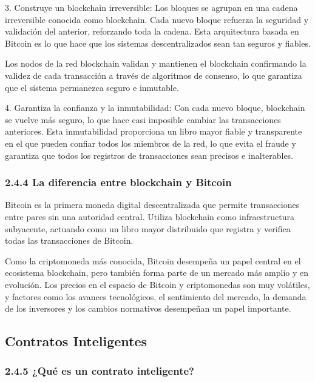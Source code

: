 \documentclass[12pt,a4paper]{article}
\begin{document}
3. Construye un blockchain irreversible: Los bloques se agrupan en una cadena irreversible conocida como blockchain. Cada nuevo bloque refuerza la seguridad y validación del anterior, reforzando toda la cadena. Esta arquitectura basada en Bitcoin es lo que hace que los sistemas descentralizados sean tan seguros y fiables.

Los nodos de la red blockchain validan y mantienen el blockchain confirmando la validez de cada
transacción a través de algoritmos de consenso, lo que garantiza que el sistema permanezca seguro
e inmutable.

4. Garantiza la confianza y la inmutabilidad: Con cada nuevo bloque, blockchain se vuelve más
seguro, lo que hace casi imposible cambiar las transacciones anteriores. Esta inmutabilidad
proporciona un libro mayor fiable y transparente en el que pueden confiar todos los miembros de la
red, lo que evita el fraude y garantiza que todos los registros de transacciones sean precisos e
inalterables.

\subsubsection*{2.4.4 La diferencia entre blockchain y Bitcoin}

Bitcoin es la primera moneda digital descentralizada que permite transacciones entre pares sin una
autoridad central. Utiliza blockchain como infraestructura subyacente, actuando como un libro mayor
distribuido que registra y verifica todas las transacciones de Bitcoin.

Como la criptomoneda más conocida, Bitcoin desempeña un papel central en el ecosistema
blockchain, pero también forma parte de un mercado más amplio y en evolución. Los precios en el
espacio de Bitcoin y criptomonedas son muy volátiles, y factores como los avances tecnológicos, el
sentimiento del mercado, la demanda de los inversores y los cambios normativos desempeñan un
papel importante.

\subsection*{Contratos Inteligentes}

\subsubsection*{2.4.5 ¿Qué es un contrato inteligente?}
\end{document}
